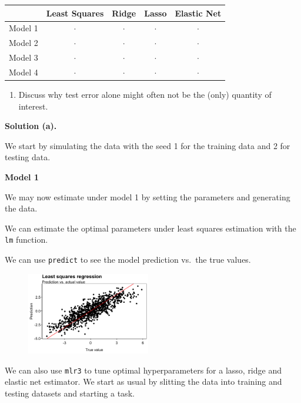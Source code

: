 \documentclass[
]{book}
\providecommand{\tightlist}{%
  \setlength{\itemsep}{0pt}\setlength{\parskip}{0pt}}
\begin{document}
\begin{longtable}[]{@{}lcccc@{}}
\toprule()
& Least Squares & Ridge & Lasso & Elastic Net \\
\midrule()
\endhead
Model 1 & \(\cdot\) & \(\cdot\) & \(\cdot\) & \(\cdot\) \\
Model 2 & \(\cdot\) & \(\cdot\) & \(\cdot\) & \(\cdot\) \\
Model 3 & \(\cdot\) & \(\cdot\) & \(\cdot\) & \(\cdot\) \\
Model 4 & \(\cdot\) & \(\cdot\) & \(\cdot\) & \(\cdot\) \\
\bottomrule()
\end{longtable}

\begin{enumerate}
\def\labelenumi{\alph{enumi}.}
\setcounter{enumi}{2}
\tightlist
\item
  Discuss why test error alone might often not be the (only) quantity of interest.
\end{enumerate}

\textbf{Solution (a).}

We start by simulating the data with the seed 1 for the training data and 2 for testing data.

\textbf{Model 1}

We may now estimate under model 1 by setting the parameters and generating the data.

We can estimate the optimal parameters under least squares estimation with the \texttt{lm} function.

We can use \texttt{predict} to see the model prediction vs.~the true values.

\begin{figure}[H]
  \begin{center}
    \includegraphics[width=0.48\textwidth]{figures/ML_week2_ex1_01.png}
  \end{center}
\end{figure}

We can also use \texttt{mlr3} to tune optimal hyperparameters for a lasso, ridge and elastic net estimator. We start as usual by slitting the data into training and testing datasets and starting a task.
\end{document}
